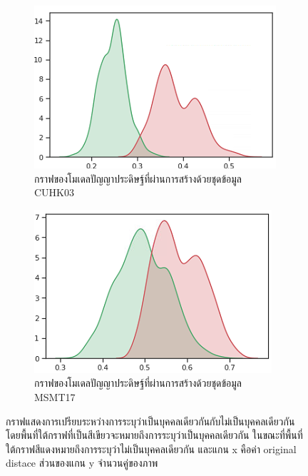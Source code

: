 \begin{figure}[!ht]
\begin{subfigure}[b]{0.4\textwidth}
        \includegraphics[width=\textwidth]{chapter4/images/graph_cuhk.png}
	\caption{กราฟของโมเดลปัญญาประดิษฐ์ที่ผ่านการสร้างด้วยชุดข้อมูล CUHK03}
        \label{fig:graph_cuhk}
    \end{subfigure}
    \hfill
    \begin{subfigure}[b]{0.4\textwidth}
        \centering
        \includegraphics[width=\textwidth]{chapter4/images/graph_msmt.png}
	\caption{กราฟของโมเดลปัญญาประดิษฐ์ที่ผ่านการสร้างด้วยชุดข้อมูล MSMT17}
        \label{fig:graph_msmt}
    \end{subfigure}
    \hfill
    \caption{กราฟแสดงการเปรียบระหว่างการระบุว่าเป็นบุคคลเดียวกันกับไม่เป็นบุคคลเดียวกัน โดยพื้นที่ใต้กราฟที่เป็นสีเขียวจะหมายถึงการระบุว่าเป็นบุคคลเดียวกัน ในขณะที่พื้นที่ใต้กราฟสีแดงหมายถึงการระบุว่าไม่เป็นบุคคลเดียวกัน และแกน x คือค่า original distace ส่วนของแกน y จำนวนคู่ของภาพ  }
    \label{fig: กราฟแสดงการเปรียบระหว่างการระบุว่าเป็นบุคคลเดียวกันกับไม่เป็นบุคคลเดียวกัน}
\end{figure}
